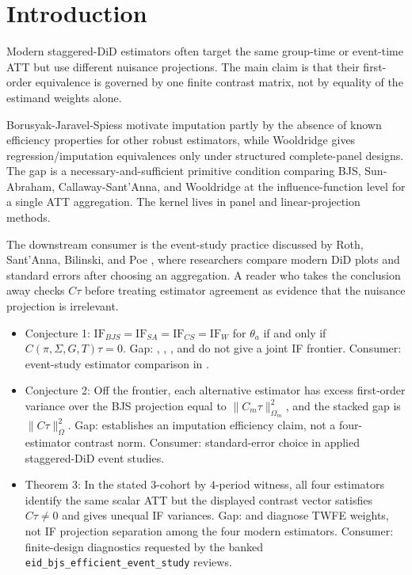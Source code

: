 \documentclass[11pt]{article}
\theoremstyle{definition}
\theoremstyle{plain}
\theoremstyle{remark}
\begin{document}
\section{Introduction}
Modern staggered-DiD estimators often target the same group-time or event-time ATT but use different nuisance projections. The main claim is that their first-order equivalence is governed by one finite contrast matrix, not by equality of the estimand weights alone.

Borusyak-Jaravel-Spiess \citep[pp. 326--327]{borusyak_jaravel_spiess_2024_restud} motivate imputation partly by the absence of known efficiency properties for other robust estimators, while Wooldridge \citep[Sec. 3]{wooldridge_2023_ectj} gives regression/imputation equivalences only under structured complete-panel designs. The gap is a necessary-and-sufficient primitive condition comparing BJS, Sun-Abraham, Callaway-Sant'Anna, and Wooldridge at the influence-function level for a single ATT aggregation. The kernel lives in panel and linear-projection methods.

The downstream consumer is the event-study practice discussed by Roth, Sant'Anna, Bilinski, and Poe \citep{roth_santanna_bilinski_poe_2023_joe}, where researchers compare modern DiD plots and standard errors after choosing an aggregation. A reader who takes the conclusion away checks $C\tau$ before treating estimator agreement as evidence that the nuisance projection is irrelevant.

\begin{itemize}[leftmargin=*]
\item Conjecture 1: $\mathrm{IF}_{BJS}=\mathrm{IF}_{SA}=\mathrm{IF}_{CS}=\mathrm{IF}_{W}$ for $\theta_a$ if and only if $C(\pi,\Sigma,G,T)\tau=0$. Gap: \citet{borusyak_jaravel_spiess_2024_restud}, \citet{sun_abraham_2021_joe}, \citet{callaway_santanna_2021_joe}, and \citet{wooldridge_2023_ectj} do not give a joint IF frontier. Consumer: event-study estimator comparison in \citet{roth_santanna_bilinski_poe_2023_joe}.
\item Conjecture 2: Off the frontier, each alternative estimator has excess first-order variance over the BJS projection equal to $\|C_m\tau\|^2_{\Omega_m}$, and the stacked gap is $\|C\tau\|^2_\Omega$. Gap: \citet{borusyak_jaravel_spiess_2024_restud} establishes an imputation efficiency claim, not a four-estimator contrast norm. Consumer: standard-error choice in applied staggered-DiD event studies.
\item Theorem 3: In the stated $3$-cohort by $4$-period witness, all four estimators identify the same scalar ATT but the displayed contrast vector satisfies $C\tau\neq0$ and gives unequal IF variances. Gap: \citet{goodman_bacon_2021_joe} and \citet{dechaisemartin_dhaultfoeuille_2020_aer} diagnose TWFE weights, not IF projection separation among the four modern estimators. Consumer: finite-design diagnostics requested by the banked \texttt{eid\_bjs\_efficient\_event\_study} reviews.
\end{itemize}
\end{document}
